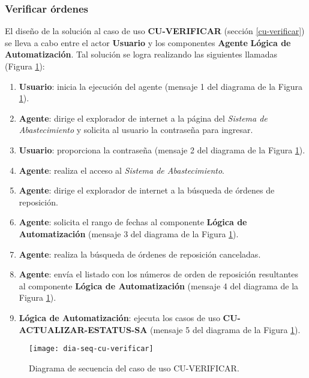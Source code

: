 \subsubsection{Verificar órdenes}
El diseño de la solución al caso de uso \textbf{CU-VERIFICAR} (sección \ref{cu-verificar}) se lleva a cabo entre el actor \textbf{Usuario} y los componentes \textbf{Agente} \textbf{Lógica de Automatización}. Tal solución se logra realizando las siguientes llamadas (Figura \ref{fig:dia-seq-cu-verificar}):
\begin{enumerate}
	\item \textbf{Usuario}: inicia la ejecución del agente (mensaje 1 del diagrama de la Figura \ref{fig:dia-seq-cu-verificar}).
	\item \textbf{Agente}: dirige el explorador de internet a la página del \textit{Sistema de Abastecimiento} y solicita al usuario la contraseña para ingresar.
	\item \textbf{Usuario}: proporciona la contraseña (mensaje 2 del diagrama de la Figura \ref{fig:dia-seq-cu-verificar}).
	\item \textbf{Agente}: realiza el acceso al \textit{Sistema de Abastecimiento}.
	\item \textbf{Agente}: dirige el explorador de internet a la búsqueda de órdenes de reposición.
	\item \textbf{Agente}: solicita el rango de fechas al componente \textbf{Lógica de Automatización} (mensaje 3 del diagrama de la Figura \ref{fig:dia-seq-cu-verificar}).
	\item \textbf{Agente}: realiza la búsqueda de órdenes de reposición canceladas.
	\item \textbf{Agente}: envía el listado con los números de orden de reposición resultantes al componente \textbf{Lógica de Automatización} (mensaje 4 del diagrama de la Figura \ref{fig:dia-seq-cu-verificar}).
	\item \textbf{Lógica de Automatización}: ejecuta los casos de uso \textbf{CU-ACTUALIZAR-ESTATUS-SA} (mensaje 5 del diagrama de la Figura \ref{fig:dia-seq-cu-verificar}).
\end{enumerate}

\begin{figure}[h]
	\centering
	\texttt{[image: dia-seq-cu-verificar]}
	\caption{Diagrama de secuencia del caso de uso CU-VERIFICAR.}
	\label{fig:dia-seq-cu-verificar}
\end{figure}

